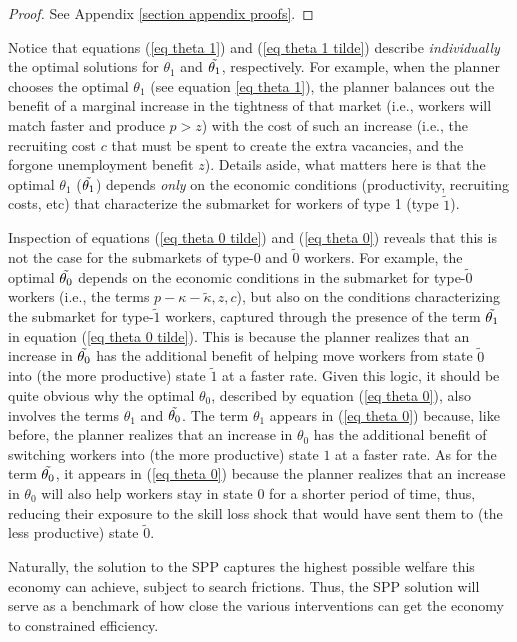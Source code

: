 \documentclass[12pt]{article} %
\theoremstyle{definition}
\begin{document}
\begin{proof}
See Appendix \ref{section appendix proofs}.     
\end{proof}
Notice that equations (\ref{eq theta 1}) and (\ref{eq theta 1 tilde}) describe \textit{individually} the optimal solutions for $\theta_1$ and $\Tilde{\theta_1}$, respectively. For example, when the planner chooses the optimal $\theta_1$ (see equation \ref{eq theta 1}), the planner balances out the benefit of a marginal increase in the tightness of that market (i.e., workers will match faster and produce $p>z$) with the cost of such an increase (i.e., the recruiting cost $c$ that must be spent to create the extra vacancies, and the forgone unemployment benefit $z$). Details aside, what matters here is that the optimal $\theta_1$ ($\Tilde{\theta_1}$) depends \textit{only} on the economic conditions (productivity, recruiting costs, etc) that characterize the submarket for workers of type 1 (type $\tilde{1}$). 

Inspection of equations (\ref{eq theta 0 tilde}) and (\ref{eq theta 0}) reveals that this is not the case for the submarkets of type-0 and $\tilde{0}$ workers. For example, the optimal $\Tilde{\theta_0}$ depends on the economic conditions in the submarket for type-$\tilde{0}$ workers (i.e., the terms $p-\kappa-\tilde{\kappa}, z, c$), but also on the conditions characterizing the submarket for type-$\tilde{1}$ workers, captured through the presence of the term $\Tilde{\theta_1}$ in equation (\ref{eq theta 0 tilde}). This is because the planner realizes that an increase in $\Tilde{\theta_0}$ has the additional benefit of helping move workers from state $\tilde{0}$ into (the more productive) state $\tilde{1}$ at a faster rate. Given this logic, it should be quite obvious why the optimal $\theta_0$, described by equation (\ref{eq theta 0}), also involves the terms $\theta_1$ and $\Tilde{\theta_0}$. The term $\theta_1$ appears in (\ref{eq theta 0}) because, like before, the planner realizes that an increase in ${\theta_0}$ has the additional benefit of switching workers into (the more productive) state ${1}$ at a faster rate. As for the term $\Tilde{\theta_0}$, it appears in (\ref{eq theta 0}) because the planner realizes that an increase in ${\theta_0}$ will also help workers stay in state 0 for a shorter period of time, thus, reducing their exposure to the skill loss shock that would have sent them to (the less productive) state $\tilde{0}$. 

Naturally, the solution to the SPP captures the highest possible welfare this economy can achieve, subject to search frictions. Thus, the SPP solution will serve as a benchmark of how close the various interventions can get the economy to constrained efficiency. 
\end{document}
